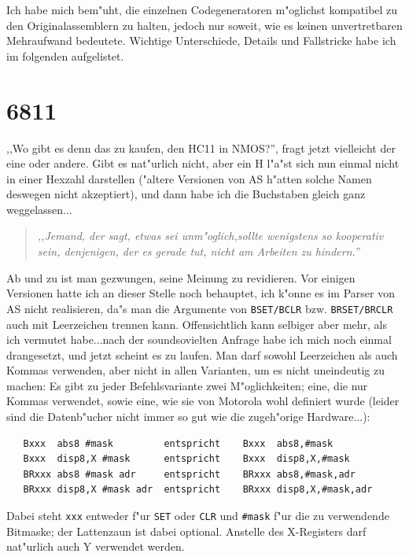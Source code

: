 \documentclass[12pt,a4paper,twoside]{report}
\newcommand{\tty}[1]{{\tt #1}}
\newcommand{\asname}{AS}
\begin{document}
Ich habe mich bem"uht, die einzelnen Codegeneratoren m"oglichst kompatibel
zu den Originalassemblern zu halten, jedoch nur soweit, wie es keinen
unvertretbaren Mehraufwand bedeutete.  Wichtige Unterschiede, Details und
Fallstricke habe ich im folgenden aufgelistet.


\section{6811}

,,Wo gibt es denn das zu kaufen, den HC11 in NMOS?'', fragt jetzt vielleicht
der eine oder andere.  Gibt es nat"urlich nicht, aber ein H l"a"st sich nun
einmal nicht in einer Hexzahl darstellen ("altere Versionen von \asname{} h"atten
solche Namen deswegen nicht akzeptiert), und dann habe ich die Buchstaben
gleich ganz weggelassen...
\par
\begin{quote}{\it
,,Jemand, der sagt, etwas sei unm"oglich,sollte wenigstens so kooperativ
sein, denjenigen, der es gerade tut, nicht am Arbeiten zu hindern.''
}\end{quote}
Ab und zu ist man gezwungen, seine Meinung zu revidieren.  Vor einigen
Versionen hatte ich an dieser Stelle noch behauptet, ich k"onne es im Parser
von \asname{} nicht realisieren, da"s man die Argumente von \tty{BSET/BCLR} bzw.
\tty{BRSET/BRCLR} auch mit Leerzeichen trennen kann.  Offensichtlich kann
selbiger aber mehr, als ich vermutet habe...nach der soundsovielten Anfrage
habe ich mich noch einmal drangesetzt, und jetzt scheint es zu laufen.  Man
darf sowohl Leerzeichen als auch Kommas verwenden, aber nicht in allen
Varianten, um es nicht uneindeutig zu machen:  Es gibt zu jeder
Befehlsvariante zwei M"oglichkeiten; eine, die nur Kommas verwendet, sowie
eine, wie sie von Motorola wohl definiert wurde (leider sind die Datenb"ucher
nicht immer so gut wie die zugeh"orige Hardware...):
\begin{verbatim}
   Bxxx  abs8 #mask         entspricht    Bxxx  abs8,#mask
   Bxxx  disp8,X #mask      entspricht    Bxxx  disp8,X,#mask
   BRxxx abs8 #mask adr     entspricht    BRxxx abs8,#mask,adr
   BRxxx disp8,X #mask adr  entspricht    BRxxx disp8,X,#mask,adr
\end{verbatim}
Dabei steht \tty{xxx} entweder f"ur \tty{SET} oder \tty{CLR} und \tty{\#mask}
f"ur die zu verwendende Bitmaske; der Lattenzaun ist dabei optional.
Anstelle des X-Registers darf nat"urlich auch Y verwendet werden.
\end{document}
